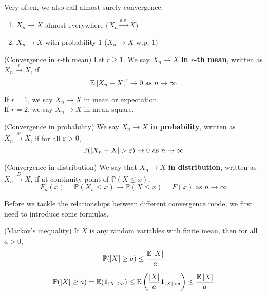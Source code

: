\documentclass{huhtakm-template-book}
\newcommand{\prob}{\mathbb{P}}
\newcommand{\expect}{\mathbb{E}}
\begin{document}
\begin{rem}
	Very often, we also call almost surely convergence:
	\begin{enumerate}
		\item $X_{n}\to X$ almost everywhere ($X_{n}\xrightarrow{\text{a.e.}}X$)
		\item $X_{n}\to X$ with probability $1$ ($X_{n}\to X$ w.p. $1$)
	\end{enumerate}
\end{rem}
\begin{defn}(Convergence in $r$-th mean)
	Let $r\geq 1$. We say $X_{n}\to X$ \textbf{in $r$-th mean}, written as $X_{n}\xrightarrow{r}X$, if
	\begin{equation*}
		\expect\abs{X_{n}-X}^{r}\to 0\text{ as }n\to\infty
	\end{equation*}
\end{defn}
\begin{eg}
	If $r=1$, we say $X_{n}\to X$ in mean or expectation.\\
	If $r=2$, we say $X_{n}\to X$ in mean square.
\end{eg}
\begin{defn}(Convergence in probability)
	We say $X_{n}\to X$ \textbf{in probability}, written as $X_{n}\xrightarrow{\prob}X$, if for all $\varepsilon>0$,
	\begin{equation*}
		\prob(\abs{X_{n}-X}>\varepsilon)\to 0\text{ as }n\to\infty
	\end{equation*}
\end{defn}
\begin{defn}(Convergence in distribution)
	We say that $X_{n}\to X$ \textbf{in distribution}, written as $X_{n}\xrightarrow{D}X$, if at continuity point of $\prob(X\leq x)$,
	\begin{equation*}
		F_{n}(x)=\prob(X_{n}\leq x)\to\prob(X\leq x)=F(x)\text{ as }n\to\infty
	\end{equation*}
\end{defn}
Before we tackle the relationships between different convergence mode, we first need to introduce some formulas.
\begin{lem}(Markov's inequality)
	If $X$ is any random variables with finite mean, then for all $a>0$,
	\begin{equation*}
		\prob(\abs{X}\geq a)\leq\frac{\expect\abs{X}}{a}
	\end{equation*}
\end{lem}
\begin{proofing}
	\begin{equation*}
		\prob(\abs{X}\geq a)=\expect(\mathbf{1}_{\abs{X}\geq a})\leq\expect\left(\frac{\abs{X}}{a}\mathbf{1}_{\abs{X}>a}\right)\leq\frac{\expect\abs{X}}{a}
	\end{equation*}
\end{proofing}
\end{document}
